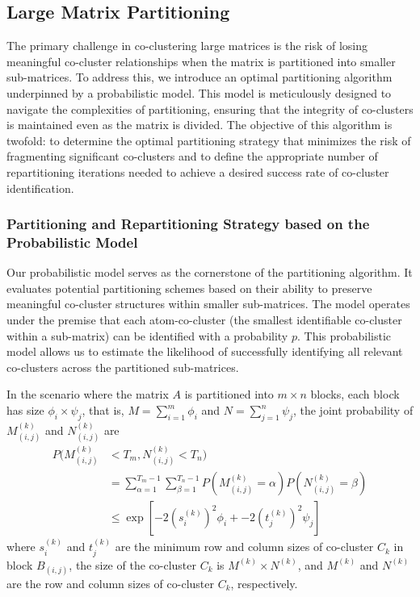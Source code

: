\subsection{Large Matrix Partitioning}
The primary challenge in co-clustering large matrices is the risk of losing meaningful co-cluster relationships when the matrix is partitioned into smaller sub-matrices. To address this, we introduce an optimal partitioning algorithm underpinned by a probabilistic model. This model is meticulously designed to navigate the complexities of partitioning, ensuring that the integrity of co-clusters is maintained even as the matrix is divided. The objective of this algorithm is twofold: to determine the optimal partitioning strategy that minimizes the risk of fragmenting significant co-clusters and to define the appropriate number of repartitioning iterations needed to achieve a desired success rate of co-cluster identification.

\subsubsection{Partitioning and Repartitioning Strategy based on the Probabilistic Model}
Our probabilistic model serves as the cornerstone of the partitioning algorithm. It evaluates potential partitioning schemes based on their ability to preserve meaningful co-cluster structures within smaller sub-matrices. The model operates under the premise that each atom-co-cluster (the smallest identifiable co-cluster within a sub-matrix) can be identified with a probability $p$. This probabilistic model allows us to estimate the likelihood of successfully identifying all relevant co-clusters across the partitioned sub-matrices.

In the scenario where the matrix $A$ is partitioned into $m \times n$ blocks, each block has size $\phi_i \times \psi_j$, that is, $M=\sum_{i=1}^m \phi_i$ and $N=\sum_{j=1}^n \psi_j$, the joint probability of $M_{(i,j)}^{(k)}$ and $N_{(i,j)}^{(k)}$ are
\begin{align*}
    P(M_{(i,j)}^{(k)} & < T_m, N_{(i,j)}^{(k)} < T_n)                               \\ & = \sum_{\alpha=1}^{T_m-1} \sum_{\beta=1}^{T_n-1} P(M_{(i,j)}^{(k)} = \alpha) P(N_{(i,j)}^{(k)} = \beta) \\
                      & \le \exp[-2 (s_i^{(k)})^2 \phi_i + -2 (t_j^{(k)})^2 \psi_j]
\end{align*}
where $s_i^{(k)}$ and $t_j^{(k)}$ are the minimum row and column sizes of co-cluster $C_k$ in block $B_{(i,j)}$, the size of the co-cluster $C_k$ is $M^{(k)} \times N^{(k)}$, and $M^{(k)}$ and $N^{(k)}$ are the row and column sizes of co-cluster $C_k$, respectively. 

